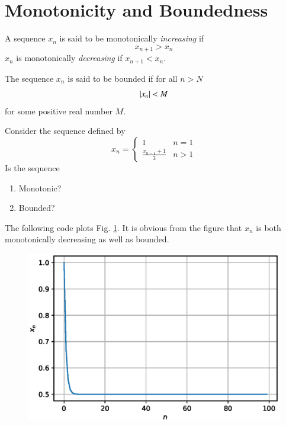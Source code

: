 \documentclass[journal,12pt,twocolumn]{IEEEtran}
\begin{document}
\section{Monotonicity and Boundedness}
\begin{definition}
A sequence $x_n$ is said to be monotonically {\em increasing} if
\begin{equation}
x_{n+1} > x_n
\end{equation}
$x_n$ is monotonically {\em decreasing} if $x_{n+1} < x_n$.
\end{definition}
\begin{definition}
The sequence $x_n$ is said to be bounded if for all $n > N $
%
\begin{equation}
\left\vert x_n\right\vert < M
\end{equation}
%
for some positive real number $M$.
\end{definition}
\begin{problem}
\label{prob:monotone}
Consider the sequence defined by
\begin{equation}
\label{eq:monotone}
x_n = 
\begin{cases}
1 & n = 1
\\
\frac{x_{n-1}+1}{3} & n > 1
\end{cases}
\end{equation}
Is the sequence
\begin{enumerate}
\item Monotonic?
\item Bounded?
\end{enumerate}
\end{problem}
\solution The following code plots Fig. \ref{fig:seq_monotone}. It is obvious from the figure that $x_n$ is both monotonically decreasing as
well as bounded.

\begin{figure}[!ht]
\begin{center}
\includegraphics[width=\columnwidth]{./figs/seq_monotone.eps}
\end{center}
\label{fig:seq_monotone}	
\end{figure}
\end{document}
